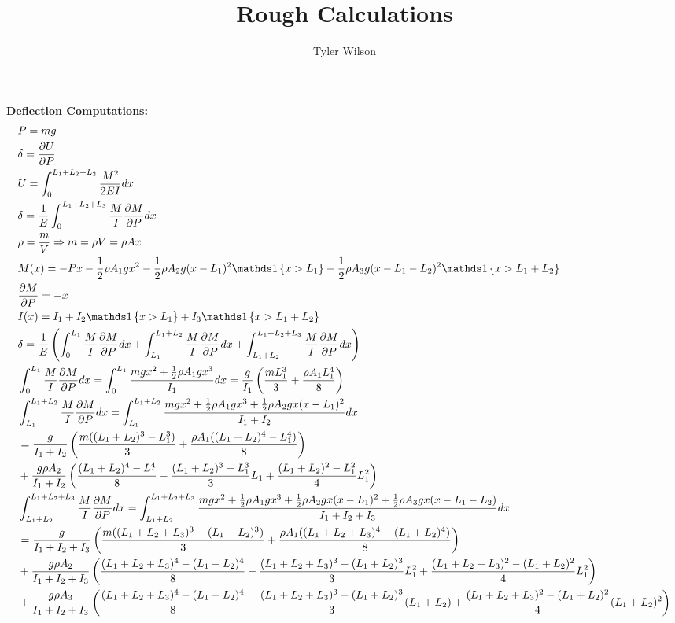 \documentclass[11pt, fleqn]{article}
\title{Rough Calculations}
\author{Tyler Wilson}
\begin{document}
\allowdisplaybreaks
\maketitle

\textbf{Deflection Computations:}
\tiny
\begin{align*}
    &P=mg\\
    &\delta=\pdx[U]{P}\\
    &U=\int_0^{L_1+L_2+L_3}\frac{M^2}{2EI}dx\\
    &\delta=\frac{1}{E}\int_0^{L_1+L_2+L_3}\frac{M}{I}\pdx[M]{P}dx\\
    &\rho=\frac{m}{V}\Ra m=\rho V=\rho Ax\\
    &M(x)=-Px-\frac{1}{2}\rho A_1gx^2-\frac{1}{2}\rho A_2g(x-L_1)^2\ind\brcurly{x>L_1}-\frac{1}{2}\rho A_3g(x-L_1-L_2)^2\ind\brcurly{x>L_1+L_2}\\
    &\pdx[M]{P}=-x\\
    &I(x)=I_1+I_2\ind\brcurly{x>L_1}+I_3\ind\brcurly{x>L_1+L_2}\\
    &\delta=\frac{1}{E}\brround{\int_0^{L_1}\frac{M}{I}\pdx[M]{P}dx+\int_{L_1}^{L_1+L_2}\frac{M}{I}\pdx[M]{P}dx+\int_{L_1+L_2}^{L_1+L_2+L_3}\frac{M}{I}\pdx[M]{P}dx}\\
    &\int_0^{L_1}\frac{M}{I}\pdx[M]{P}dx=\int_0^{L_1}\frac{mgx^2+\frac{1}{2}\rho A_1gx^3}{I_1}dx=\frac{g}{I_1}\brround{\frac{mL_1^3}{3}+\frac{\rho A_1L_1^4}{8}}\\
    &\int_{L_1}^{L_1+L_2}\frac{M}{I}\pdx[M]{P}dx=\int_{L_1}^{L_1+L_2}\frac{mgx^2+\frac{1}{2}\rho A_1gx^3+\frac{1}{2}\rho A_2gx(x-L_1)^2}{I_1+I_2}dx\\
    &=\frac{g}{I_1+I_2}\brround{\frac{m((L_1+L_2)^3-L_1^3)}{3}+\frac{\rho A_1((L_1+L_2)^4-L_1^4)}{8}}\\
    &+\frac{g\rho A_2}{I_1+I_2}\brround{\frac{(L_1+L_2)^4-L_1^4}{8}-\frac{(L_1+L_2)^3-L_1^3}{3}L_1+\frac{(L_1+L_2)^2-L_1^2}{4}L_1^2}\\
    &\int_{L_1+L_2}^{L_1+L_2+L_3}\frac{M}{I}\pdx[M]{P}dx=\int_{L_1+L_2}^{L_1+L_2+L_3}\frac{mgx^2+\frac{1}{2}\rho A_1gx^3+\frac{1}{2}\rho A_2gx(x-L_1)^2+\frac{1}{2}\rho A_3gx(x-L_1-L_2)}{I_1+I_2+I_3}dx\\
    &=\frac{g}{I_1+I_2+I_3}\brround{\frac{m((L_1+L_2+L_3)^3-(L_1+L_2)^3)}{3}+\frac{\rho A_1((L_1+L_2+L_3)^4-(L_1+L_2)^4)}{8}}\\
    &+\frac{g\rho A_2}{I_1+I_2+I_3}\brround{\frac{(L_1+L_2+L_3)^4-(L_1+L_2)^4}{8}-\frac{(L_1+L_2+L_3)^3-(L_1+L_2)^3}{3}L_1^2+\frac{(L_1+L_2+L_3)^2-(L_1+L_2)^2}{4}L_1^2}\\
    &+\frac{g\rho A_3}{I_1+I_2+I_3}\brround{\frac{(L_1+L_2+L_3)^4-(L_1+L_2)^4}{8}-\frac{(L_1+L_2+L_3)^3-(L_1+L_2)^3}{3}(L_1+L_2)+\frac{(L_1+L_2+L_3)^2-(L_1+L_2)^2}{4}(L_1+L_2)^2}
\end{align*}
\end{document}
